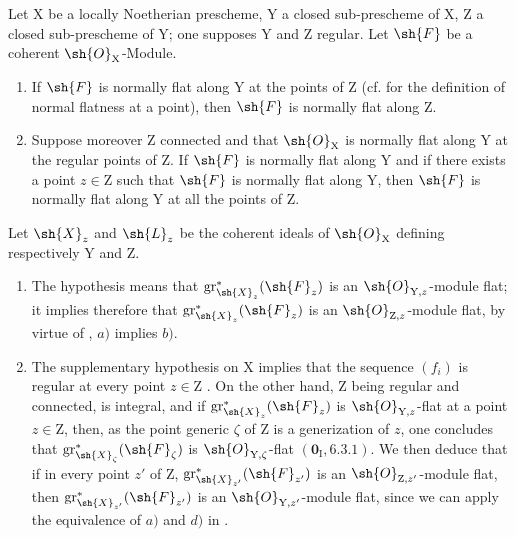 \begin{corollary}[19.7.5]
\label{IV.19.7.5}
Let $\mathrm{X}$ be a locally Noetherian prescheme, $\mathrm{Y}$ a closed sub-prescheme of $\mathrm{X}$, $\mathrm{Z}$ a closed sub-prescheme of $\mathrm{Y}$; one supposes $\mathrm{Y}$ and $\mathrm{Z}$ regular. Let $\sh{F}$ be a coherent $\sh{O}_\mathrm{X}$-Module.
\begin{enumerate}
\item[\rm(i)] If $\sh{F}$ is normally flat along $\mathrm{Y}$ at the points of $\mathrm{Z}$ (cf.  for the definition of normal flatness at a point), then $\sh{F}$ is normally flat along $\mathrm{Z}$.
\item[\rm(ii)] Suppose moreover $\mathrm{Z}$ connected and that $\sh{O}_\mathrm{X}$ is normally flat along $\mathrm{Y}$ at the regular points of $\mathrm{Z}$. If $\sh{F}$ is normally flat along $\mathrm{Y}$ and if there exists a point $z\in\mathrm{Z}$ such that $\sh{F}$ is normally flat along $\mathrm{Y}$, then $\sh{F}$ is normally flat along $\mathrm{Y}$ at all the points of $\mathrm{Z}$.
\end{enumerate}

Let $\sh{X}_z$ and $\sh{L}_z$ be the coherent ideals of $\sh{O}_\mathrm{X}$ defining respectively $\mathrm{Y}$ and $\mathrm{Z}$.
\begin{enumerate}
\item[\rm(i)] The hypothesis means that $\operatorname{gr}_{\sh{X}_z}^*(\sh{F}_z)$ is an $\sh{O}_{\mathrm{Y},z}$-module flat; it implies therefore that $\operatorname{gr}_{\sh{X}_z}^*(\sh{F}_z)$ is an $\sh{O}_{\mathrm{Z},z}$-module flat, by virtue of , $a)$ implies $b)$.
\item[\rm(ii)] The supplementary hypothesis on $\mathrm{X}$ implies that the sequence $(f_i)$ is regular at every point $z\in\mathrm{Z}$ . On the other hand, $\mathrm{Z}$ being regular and connected, is integral, and if $\operatorname{gr}_{\sh{X}_z}^*(\sh{F}_z)$ is $\sh{O}_{\mathrm{Y},z}$-flat at a point $z\in\mathrm{Z}$, then, as the point generic $\zeta$ of $\mathrm{Z}$ is a generization of $z$, one concludes that $\operatorname{gr}_{\sh{X}_\zeta}^*(\sh{F}_\zeta)$ is $\sh{O}_{\mathrm{Y},\zeta}$-flat $(\mathbf{0}_\mathrm{I},6.3.1)$. We then deduce that if in every point $z'$ of $\mathrm{Z}$, $\operatorname{gr}_{\sh{X}_{z'}}^*(\sh{F}_{z'})$ is an $\sh{O}_{\mathrm{Z},z'}$-module flat, then $\operatorname{gr}_{\sh{X}_{z'}}^*(\sh{F}_{z'})$ is an $\sh{O}_{\mathrm{Y},z'}$-module flat, since we can apply the equivalence of $a)$ and $d)$ in .
\end{enumerate}
\end{corollary}

